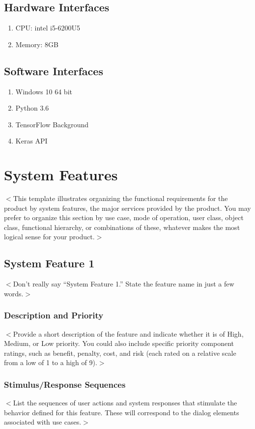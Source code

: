 \documentclass{scrreprt}
\begin{document}
\begin{CJK}{UTF8}{bkai}
\section{Hardware Interfaces}
\begin{enumerate}
    \item CPU: intel i5-6200U5
    \item Memory: 8GB
\end{enumerate}

\section{Software Interfaces}
\begin{enumerate}
    \item Windows 10 64 bit
    \item Python 3.6
    \item TensorFlow Background
    \item Keras API
\end{enumerate} 

\chapter{System Features}
$<$This template illustrates organizing the functional requirements for the 
product by system features, the major services provided by the product. You may 
prefer to organize this section by use case, mode of operation, user class, 
object class, functional hierarchy, or combinations of these, whatever makes the 
most logical sense for your product.$>$

\section{System Feature 1}
$<$Don’t really say “System Feature 1.” State the feature name in just a few 
words.$>$

\subsection{Description and Priority}
$<$Provide a short description of the feature and indicate whether it is of 
High, Medium, or Low priority. You could also include specific priority 
component ratings, such as benefit, penalty, cost, and risk (each rated on a 
relative scale from a low of 1 to a high of 9).$>$

\subsection{Stimulus/Response Sequences}
$<$List the sequences of user actions and system responses that stimulate the 
behavior defined for this feature. These will correspond to the dialog elements 
associated with use cases.$>$


\end{CJK}
\end{document}
